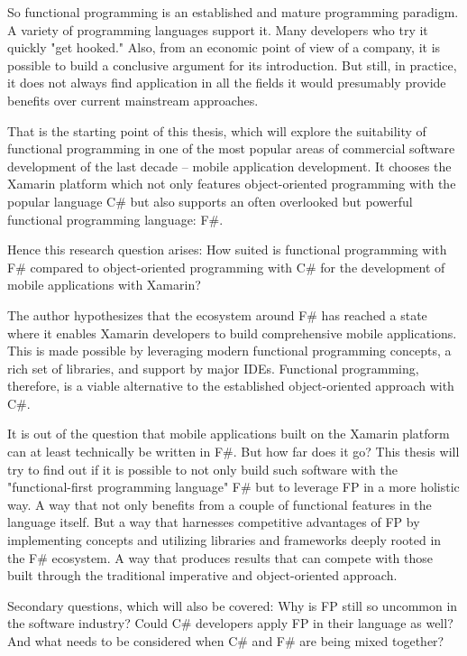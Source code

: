 So functional programming is an established and mature programming paradigm. A variety of programming languages support it. Many developers who try it quickly "get hooked." Also, from an economic point of view of a company, it is possible to build a conclusive argument for its introduction. But still, in practice, it does not always find application in all the fields it would presumably provide benefits over current mainstream approaches. 

That is the starting point of this thesis, which will explore the suitability of functional programming in one of the most popular areas of commercial software development of the last decade – mobile application development. It chooses the Xamarin platform which not only features object-oriented programming with the popular language C\# but also supports an often overlooked but powerful functional programming language: F\#. 

Hence this research question arises: How suited is functional programming with F\# compared to object-oriented programming with C\# for the development of mobile applications with Xamarin?

The author hypothesizes that the ecosystem around F\# has reached a state where it enables Xamarin developers to build comprehensive mobile applications. This is made possible by leveraging modern functional programming concepts, a rich set of libraries, and support by major IDEs. Functional programming, therefore, is a viable alternative to the established object-oriented approach with C\#. 

It is out of the question that mobile applications built on the Xamarin platform can at least technically be written in F\#. But how far does it go? This thesis will try to find out if it is possible to not only build such software with the "functional-first programming language" F\# but to leverage FP in a more holistic way. A way that not only benefits from a couple of functional features in the language itself. But a way that harnesses competitive advantages of FP by implementing concepts and utilizing libraries and frameworks deeply rooted in the F\# ecosystem. A way that produces results that can compete with those built through the traditional imperative and object-oriented approach. 

Secondary questions, which will also be covered: Why is FP still so uncommon in the software industry? Could C\# developers apply FP in their language as well? And what needs to be considered when C\# and F\# are being mixed together? 
